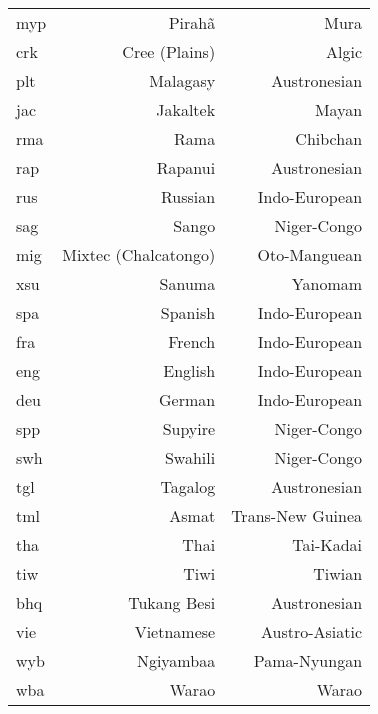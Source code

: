 {\begin{longtable}{lrr}
myp                & Pirahã                    & Mura                 \\
crk                & Cree (Plains)             & Algic                \\
plt                & Malagasy                  & Austronesian         \\
jac                & Jakaltek                  & Mayan                \\
rma                & Rama                      & Chibchan             \\
rap                & Rapanui                   & Austronesian         \\
rus                & Russian                   & Indo-European        \\
sag                & Sango                     & Niger-Congo          \\
mig                & Mixtec (Chalcatongo)      & Oto-Manguean         \\
xsu                & Sanuma                    & Yanomam              \\
spa                & Spanish                   & Indo-European        \\
fra                & French                    & Indo-European        \\
eng                & English                   & Indo-European        \\
deu                & German                    & Indo-European        \\
spp                & Supyire                   & Niger-Congo          \\
swh                & Swahili                   & Niger-Congo          \\
tgl                & Tagalog                   & Austronesian         \\
tml                & Asmat                     & Trans-New Guinea     \\
tha                & Thai                      & Tai-Kadai            \\
tiw                & Tiwi                      & Tiwian               \\
bhq                & Tukang Besi               & Austronesian         \\
vie                & Vietnamese                & Austro-Asiatic       \\
wyb                & Ngiyambaa                 & Pama-Nyungan         \\
wba                & Warao                     & Warao                \\

\end{longtable}}
